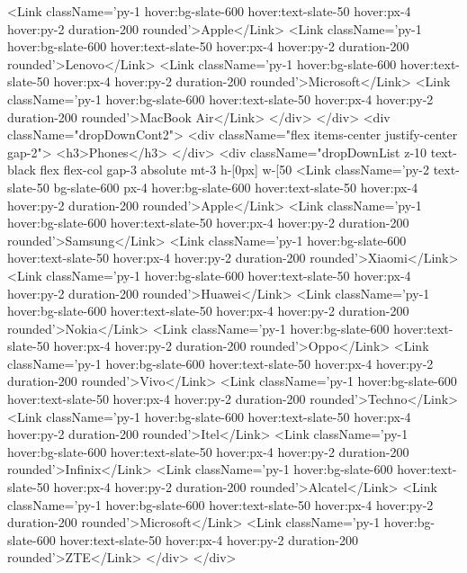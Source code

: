         <Link className='py-1 hover:bg-slate-600 hover:text-slate-50 hover:px-4 hover:py-2 duration-200 rounded'>Apple</Link>
        <Link className='py-1 hover:bg-slate-600 hover:text-slate-50 hover:px-4 hover:py-2 duration-200 rounded'>Lenovo</Link>
        <Link className='py-1 hover:bg-slate-600 hover:text-slate-50 hover:px-4 hover:py-2 duration-200 rounded'>Microsoft</Link>
        <Link className='py-1 hover:bg-slate-600 hover:text-slate-50 hover:px-4 hover:py-2 duration-200 rounded'>MacBook Air</Link>
    </div>
</div>
<div className="dropDownCont2">
    <div className="flex items-center justify-center gap-2">
        <h3>Phones</h3>
    </div>
    <div className="dropDownList z-10 text-black flex flex-col gap-3 absolute mt-3 h-[0px] w-[50%
        <Link className='py-2 text-slate-50 bg-slate-600 px-4 hover:bg-slate-600 hover:text-slate-50 hover:px-4 hover:py-2 duration-200 rounded'>Apple</Link>
        <Link className='py-1 hover:bg-slate-600 hover:text-slate-50 hover:px-4 hover:py-2 duration-200 rounded'>Samsung</Link>
        <Link className='py-1 hover:bg-slate-600 hover:text-slate-50 hover:px-4 hover:py-2 duration-200 rounded'>Xiaomi</Link>
        <Link className='py-1 hover:bg-slate-600 hover:text-slate-50 hover:px-4 hover:py-2 duration-200 rounded'>Huawei</Link>
        <Link className='py-1 hover:bg-slate-600 hover:text-slate-50 hover:px-4 hover:py-2 duration-200 rounded'>Nokia</Link>
        <Link className='py-1 hover:bg-slate-600 hover:text-slate-50 hover:px-4 hover:py-2 duration-200 rounded'>Oppo</Link>
        <Link className='py-1 hover:bg-slate-600 hover:text-slate-50 hover:px-4 hover:py-2 duration-200 rounded'>Vivo</Link>
        <Link className='py-1 hover:bg-slate-600 hover:text-slate-50 hover:px-4 hover:py-2 duration-200 rounded'>Techno</Link>
        <Link className='py-1 hover:bg-slate-600 hover:text-slate-50 hover:px-4 hover:py-2 duration-200 rounded'>Itel</Link>
        <Link className='py-1 hover:bg-slate-600 hover:text-slate-50 hover:px-4 hover:py-2 duration-200 rounded'>Infinix</Link>
        <Link className='py-1 hover:bg-slate-600 hover:text-slate-50 hover:px-4 hover:py-2 duration-200 rounded'>Alcatel</Link>
        <Link className='py-1 hover:bg-slate-600 hover:text-slate-50 hover:px-4 hover:py-2 duration-200 rounded'>Microsoft</Link>
        <Link className='py-1 hover:bg-slate-600 hover:text-slate-50 hover:px-4 hover:py-2 duration-200 rounded'>ZTE</Link>
    </div>
</div>
